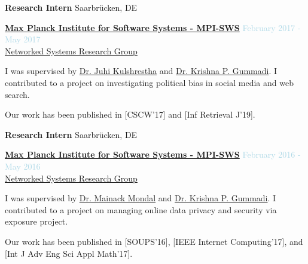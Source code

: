 \textbf{Research Intern} \hfill {Saarbrücken, DE}
\begin{outerlist}

\item[] \href{https://www.mpi-sws.org}{\textbf{Max Planck Institute for Software Systems - MPI-SWS}}  \hfill {\textcolor{lightblue}{February 2017 - May 2017}}
\\ \href{https://www.mpi-sws.org/research-areas/social-and-information-systems/}{Networked Systems Research Group}  \medskip 

        \begin{innerlist}[-]
        \item I was supervised by \href{http://www.juhikulshrestha.com}{Dr. Juhi Kulshrestha} and \href{https://people.mpi-sws.org/~gummadi/}{Dr. Krishna P. Gummadi}. I contributed to a project on investigating political bias in social media and web search.
        \item Our work has been published in [CSCW'17] and [Inf Retrieval J'19].
        \end{innerlist}

\end{outerlist}

\medskip

\textbf{Research Intern} \hfill {Saarbrücken, DE}
\begin{outerlist}

\item[] \href{https://www.mpi-sws.org}{\textbf{Max Planck Institute for Software Systems - MPI-SWS}}  \hfill {\textcolor{lightblue}{February 2016 - May 2016}}
\\ \href{https://www.mpi-sws.org/research-areas/social-and-information-systems/}{Networked Systems Research Group}  \medskip 

        \begin{innerlist}[-]
		\item I was supervised by \href{http://cse.iitkgp.ac.in/~mainack/}{Dr. Mainack Mondal} and \href{https://people.mpi-sws.org/~gummadi/}{Dr. Krishna P. Gummadi}. I contributed to a project on managing online data privacy and security via exposure project.
		\item Our work has been published in [SOUPS'16], [IEEE Internet Computing'17], and [Int J Adv Eng Sci Appl Math'17].
        \end{innerlist}

\end{outerlist}

\medskip



